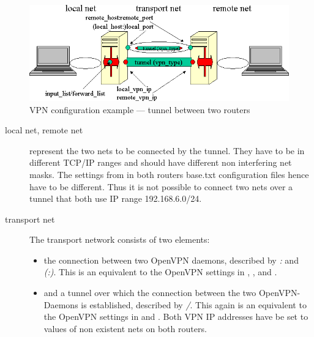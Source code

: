   \begin{figure}[htbp]
    \centering
    \includegraphics[width=\columnwidth]{openvpn-sample}
    \caption{VPN configuration example --- tunnel between two routers}
    \label{fig:tunnel}
  \end{figure}

  \begin{description}

  \item [local net, remote net] represent the two nets to be connected 
  by the tunnel. They have to be in different TCP/IP ranges and should 
  have different non interfering net masks. The settings from 
   in both routers base.txt configuration 
  files hence have to be different. Thus it is not possible to connect 
  two nets over a tunnel that both use IP range 192.168.6.0/24.

  \item [transport net] The transport network consists of two elements:

  \begin{itemize}

  \item the connection between two OpenVPN daemons, described by 
  \emph{:}
  and \emph{(:)}. 
  This is an equivalent to the OpenVPN settings in ,
  ,  and
  .

  \item and a tunnel over which the connection between the two OpenVPN-Daemons 
  is established, described by 
  \emph{/}. 
  This again is an equivalent to the OpenVPN settings in 
   and . 
  Both VPN IP addresses have be set to values of non existent nets on 
  both routers.


\end{itemize}
\end{description}
